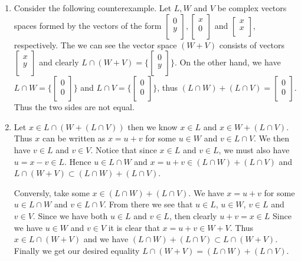 \begin{solution}
  \begin{enumerate}[label=(\alph*)]
    \item Consider the following counterexample.
      Let $L, W$ and $V$ be complex vectors spaces formed by the vectors of the form $\begin{bmatrix} 0\\ y\\ \end{bmatrix}, \begin{bmatrix} x\\ 0\\ \end{bmatrix}$ and $\begin{bmatrix} x\\ x\\ \end{bmatrix}$, respectively.
      The we can see the vector space $(W + V)$ consists of vectors $\begin{bmatrix} x\\ y\\ \end{bmatrix}$ and clearly $L \cap (W + V) = \{\begin{bmatrix} 0\\ y\\ \end{bmatrix}\}$.
      On the other hand, we have $L \cap W = \{\begin{bmatrix} 0\\ 0\\ \end{bmatrix}\}$ and $L \cap V = \{\begin{bmatrix} 0\\ 0\\ \end{bmatrix}\}$, thus $(L \cap W) + (L \cap V) = \begin{bmatrix} 0\\ 0\\ \end{bmatrix}$.
      Thus the two sides are not equal.
    \item Let $x \in L \cap (W + (L \cap V))$ then we know $x \in L$ and $x \in W + (L \cap V)$.
      Thus $x$ can be written as $x = u + v$ for some $u \in W$ and $v \in L \cap V$.
      We then have $v \in L$ and $v \in V$.
      Notice that since $x \in L$ and $v \in L$, we must also have $u = x - v \in L$.
      Hence $u \in L \cap W$ and $x = u + v \in (L \cap W) + (L \cap V)$ and $L \cap (W + V) \subset (L \cap W) + (L \cap V)$.

      Conversly, take some $x \in (L \cap W) + (L \cap V)$.
      We have $x = u + v$ for some $u \in L \cap W$ and $v \in L \cap V$.
      From there we see that $u \in L$, $u \in W$, $v \in L$ and $v \in V$.
      Since we have both $u \in L$ and $v \in L$, then clearly $u + v = x \in L$
      Since we have $u \in W$ and $v \in V$ it is clear that $x = u + v \in W + V$.
      Thus $x \in L \cap (W + V)$ and we have $(L \cap W) + (L \cap V) \subset L \cap (W + V)$.
      Finally we get our desired equality $L \cap (W + V) = (L \cap W) + (L \cap V)$.
  \end{enumerate}
\end{solution}

